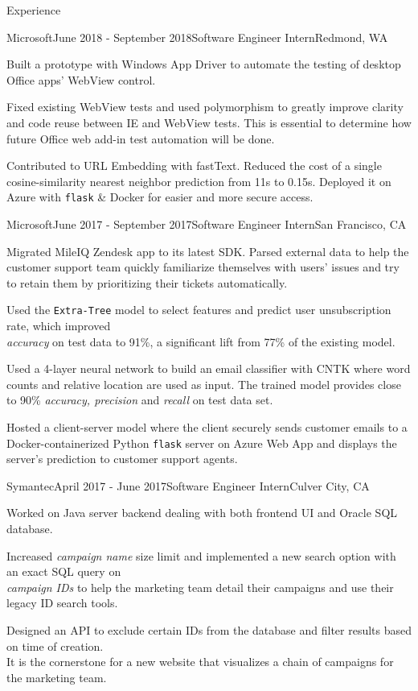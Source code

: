 \documentclass{resume} %
\begin{document}
\begin{rSection}{Experience}

\begin{rSubsection}{Microsoft}{June 2018 - September 2018}{Software Engineer Intern}{Redmond, WA}
\item Built a prototype with Windows App Driver to automate the testing of desktop Office apps' WebView control.
\item Fixed existing WebView tests and used polymorphism to greatly improve clarity and code reuse between IE and WebView tests. This is essential to determine how future Office web add-in test automation will be done.
\item Contributed to URL Embedding with fastText. Reduced the cost of a single cosine-similarity nearest neighbor prediction from 11s to 0.15s. Deployed it on Azure with \texttt{flask} \& Docker for easier and more secure access.
\end{rSubsection}

\begin{rSubsection}{Microsoft}{June 2017 - September 2017}{Software Engineer Intern}{San Francisco, CA}
\item Migrated MileIQ Zendesk app to its latest SDK. Parsed external data to help the customer support team quickly familiarize themselves with users' issues and try to retain them by prioritizing their tickets automatically.
\item Used the \texttt{Extra-Tree} model to select features and predict user unsubscription rate, which improved\\
\textit{accuracy} on test data to 91\%, a significant lift from 77\% of the existing model.
\item Used a 4-layer neural network to build an email classifier with CNTK where word counts and relative location are used as input. The trained model provides close to 90\% \textit{accuracy, precision} and \textit{recall} on test data set.
\item Hosted a client-server model where the client securely sends customer emails to a Docker-containerized Python \texttt{flask} server on Azure Web App and displays the server's prediction to customer support agents.
\end{rSubsection}

\begin{rSubsection}{Symantec}{April 2017 - June 2017}{Software Engineer Intern}{Culver City, CA}
\item Worked on Java server backend dealing with both frontend UI and Oracle SQL database.
\item Increased \textit{campaign name} size limit and implemented a new search option with an exact SQL query on\\ 
\textit{campaign IDs} to help the marketing team detail their campaigns and use their legacy ID search tools.
\item Designed an API to exclude certain IDs from the database and filter results based on time of creation.\\
It is the cornerstone for a new website that visualizes a chain of campaigns for the marketing team.
\end{rSubsection}


\end{rSection}
\end{document}
